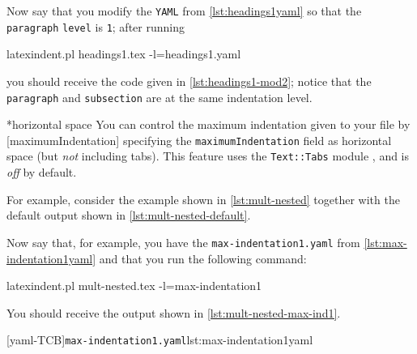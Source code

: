 	Now say that you modify the \texttt{YAML} from \cref{lst:headings1yaml} so that the \texttt{paragraph} \texttt{level} is \texttt{1}; after
	running
	\begin{commandshell}
latexindent.pl headings1.tex -l=headings1.yaml
\end{commandshell}
	you should receive the code given in \cref{lst:headings1-mod2}; notice that
	the \texttt{paragraph} and \texttt{subsection} are at the same indentation level.

*{horizontal space}
	You can control the maximum indentation given to your file by [maximumIndentation]
	specifying the \texttt{maximumIndentation} field as horizontal space (but \emph{not} including tabs).
	This feature uses the \texttt{Text::Tabs} module \cite{texttabs}, and is \emph{off}
	by default.

	For example, consider the example shown in \cref{lst:mult-nested} together with the default output
	shown in \cref{lst:mult-nested-default}.

	\begin{minipage}{.45\textwidth}
	\end{minipage}%
	\hfill
	\begin{minipage}{.45\textwidth}
	\end{minipage}

	Now say that, for example, you have the \texttt{max-indentation1.yaml} from \cref{lst:max-indentation1yaml} and
	that you run the following command:
	\begin{commandshell}
latexindent.pl mult-nested.tex -l=max-indentation1
    \end{commandshell}
	You should receive the output shown in \cref{lst:mult-nested-max-ind1}.

	\begin{minipage}{.45\textwidth}
		[yaml-TCB]{\texttt{max-indentation1.yaml}}{lst:max-indentation1yaml}
	\end{minipage}%
	\hfill
	\begin{minipage}{.45\textwidth}
	\end{minipage}

